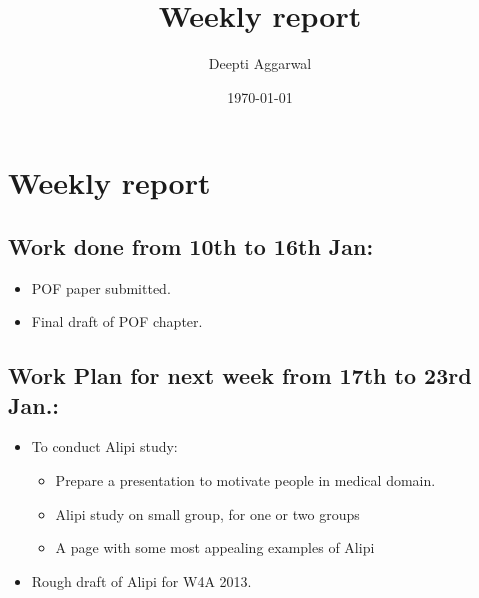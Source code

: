 \documentclass[11pt]{article}
\title{Weekly report}
\author{Deepti Aggarwal}
\date{\today}
\begin{document}
\maketitle

\setcounter{tocdepth}{3}
\vspace*{1cm}
\section{Weekly report}
\label{sec-1}


\subsection{Work done from 10th to 16th Jan:}
\label{sec-1-1}
\begin{itemize}
\item POF paper submitted.
\item Final draft of POF chapter. 
\end{itemize}


\subsection{Work Plan for next week from 17th to 23rd Jan.:}
\label{sec-1-2}
\begin{itemize}
\item To conduct Alipi study:
\begin{itemize}
\item Prepare a presentation to motivate people in medical domain.
\item Alipi study on small group, for one or two groups
\item A page with some most appealing examples of Alipi
\end{itemize}
\item Rough draft of Alipi for W4A 2013. 
\end{itemize}
\end{document}

